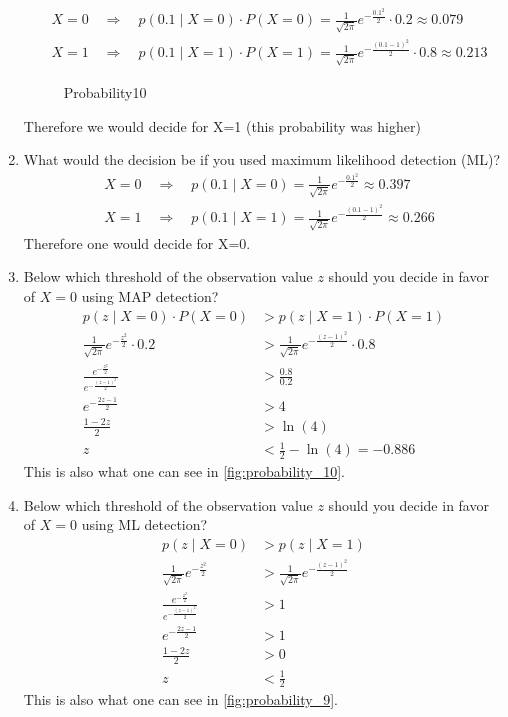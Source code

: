 \begin{enumerate}
    $$
    \begin{aligned}
    & X=0 \quad \Rightarrow \quad p(0.1 \mid X=0) \cdot P(X=0)=\frac{1}{\sqrt{2 \pi}} e^{-\frac{0.1^2}{2}} \cdot 0.2 \approx 0.079 \\
    & X=1 \quad \Rightarrow \quad p(0.1 \mid X=1) \cdot P(X=1)=\frac{1}{\sqrt{2 \pi}} e^{-\frac{(0.1-1)^2}{2}} \cdot 0.8 \approx 0.213
    \end{aligned}
    $$
    \begin{figure}[ht]
      \centering
      \caption{Probability10}
      \label{fig:probability_10}
    \end{figure}
    Therefore we would decide for X=1 (this probability was higher)
    \item What would the decision be if you used maximum likelihood detection (ML)?\newline
    $$
    \begin{aligned}
    & X=0 \quad \Rightarrow \quad p(0.1 \mid X=0)=\frac{1}{\sqrt{2 \pi}} e^{-\frac{0.1^2}{2}} \approx 0.397 \\
    & X=1 \quad \Rightarrow \quad p(0.1 \mid X=1)=\frac{1}{\sqrt{2 \pi}} e^{-\frac{(0.1-1)^2}{2}} \approx 0.266
    \end{aligned}
    $$
    Therefore one would decide for X=0.
    \item Below which threshold of the observation value $z$ should you decide in favor of $X=0$ using MAP detection?\newline
    $$
    \begin{aligned}
    p(z \mid X=0) \cdot P(X=0) & >p(z \mid X=1) \cdot P(X=1) \\
    \frac{1}{\sqrt{2 \pi}} e^{-\frac{z^2}{2}} \cdot 0.2 & >\frac{1}{\sqrt{2 \pi}} e^{-\frac{(z-1)^2}{2}} \cdot 0.8 \\
    \frac{e^{-\frac{z^2}{2}}}{e^{-\frac{(z-1)^2}{2}}} & >\frac{0.8}{0.2} \\
    e^{-\frac{2 z-1}{2}} & >4 \\
    \frac{1-2 z}{2} & >\ln (4) \\
    z & <\frac{1}{2}-\ln (4)=-0.886
    \end{aligned}
    $$
    This is also what one can see in \autoref{fig:probability_10}.
    \item Below which threshold of the observation value $z$ should you decide in favor of $X=0$ using ML detection?\newline
    $$
    \begin{aligned}
    p(z \mid X=0) & >p(z \mid X=1) \\
    \frac{1}{\sqrt{2 \pi}} e^{-\frac{z^2}{2}} & >\frac{1}{\sqrt{2 \pi}} e^{-\frac{(z-1)^2}{2}} \\
    \frac{e^{-\frac{z^2}{2}}}{e^{-\frac{(z-1)^2}{2}}} & >1 \\
    e^{-\frac{2 z-1}{2}} & >1 \\
    \frac{1-2 z}{2} & >0 \\
    z & <\frac{1}{2}
    \end{aligned}
    $$
    This is also what one can see in \autoref{fig:probability_9}.
\end{enumerate}



